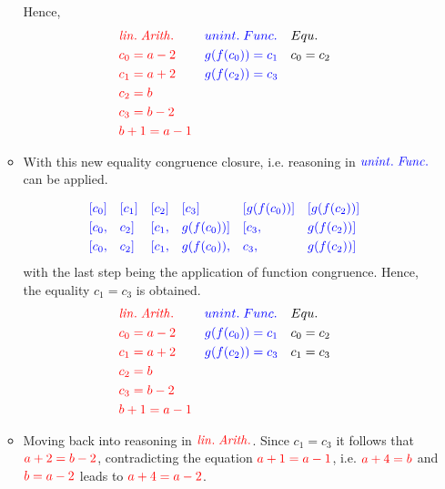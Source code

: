 \documentclass[11pt,a4paper]{article}
\begin{document}
\begin{enumerate}
\begin{itemize}
Hence, 
\begin{align*}
& \textcolor{red}{ \mathit{lin. \; Arith.} }  && \textcolor{blue}{ unint. \; Func.} &&  Equ.  &\\
& \textcolor{red}{ c_0 = a - 2 }  && \textcolor{blue}{ g(f (c_0)) = c_1 } &&  c_0 = c_2  &\\
& \textcolor{red}{ c_1 = a + 2 }  && \textcolor{blue}{ g(f (c_2)) = c_3 } &&    &\\
& \textcolor{red}{ c_2 = b  }  && \textcolor{blue}{ } &&    &\\
& \textcolor{red}{ c_3 = b-2 }  && \textcolor{blue}{ } &&    &\\
& \textcolor{red}{ b + 1 = a - 1 }  && \textcolor{blue}{ } &&    &\\
\end{align*}

\item With this new equality congruence closure, i.e. reasoning in $\textcolor{blue}{ \mathit{unint. \; Func.}} $ can be applied.

\begin{align*}
& \textcolor{blue}{[c_0]} && \textcolor{blue}{[c_1]} &&  \textcolor{blue}{[c_2]}  && \textcolor{blue}{[c_3]} && \textcolor{blue}{[g(f(c_0))]}  && \textcolor{blue}{[g(f(c_2))]} &\\
& \textcolor{blue}{[c_0,} && \textcolor{blue}{c_2]} &&  \textcolor{blue}{[c_1,}  &&  \textcolor{blue}{g(f(c_0))]} && \textcolor{blue}{[c_3,}  && \textcolor{blue}{g(f(c_2))]} &\\
& \textcolor{blue}{[c_0,} && \textcolor{blue}{c_2]} &&  \textcolor{blue}{[c_1,}  &&  \textcolor{blue}{g(f(c_0)),} && \textcolor{blue}{c_3,}  && \textcolor{blue}{g(f(c_2))]} &\\
\end{align*}
with the last step being the application of function congruence. Hence, the equality $c_1 = c_3$ is obtained.
\begin{align*}
& \textcolor{red}{ \mathit{lin. \; Arith.} }  && \textcolor{blue}{ unint. \; Func.} &&  Equ.  &\\
& \textcolor{red}{ c_0 = a - 2 }  && \textcolor{blue}{ g(f (c_0)) = c_1 } &&  c_0 = c_2  &\\
& \textcolor{red}{ c_1 = a + 2 }  && \textcolor{blue}{ g(f (c_2)) = c_3 } &&   c_1 = c_3 &\\
& \textcolor{red}{ c_2 = b  }  && \textcolor{blue}{ } &&    &\\
& \textcolor{red}{ c_3 = b-2 }  && \textcolor{blue}{ } &&    &\\
& \textcolor{red}{ b + 1 = a - 1 }  && \textcolor{blue}{ } &&    &\\
\end{align*}
\item Moving back into reasoning in $\textcolor{red}{ \mathit{lin. \; Arith.} }$. Since $c_1 = c_3$ it follows that $\textcolor{red}{ a + 2  =  b - 2}$, contradicting the equation $\textcolor{red}{ a + 1 = a - 1}$, i.e. $\textcolor{red}{ a + 4  =  b }$ and $\textcolor{red}{ b  =  a - 2}$ leads to $\textcolor{red}{ a + 4  =  a - 2}$.


\end{itemize}
\end{enumerate}
\end{document}

